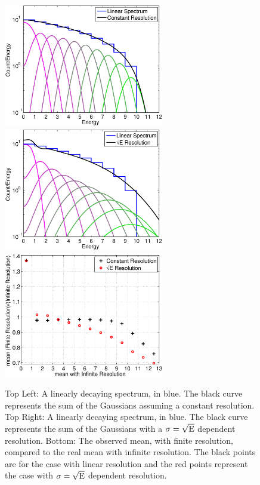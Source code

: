  \begin{figure}[h!]\centering
\includegraphics[width=70mm]{Chapter_Flucs/Figures/Toy_Model_lin_const}
\includegraphics[width=70mm]{Chapter_Flucs/Figures/Toy_Model_lin_dep}
\includegraphics[width=70mm]{Chapter_Flucs/Figures/Toy_Model_mean_shift}
\caption{Top Left: A linearly decaying spectrum, in blue. The black curve represents the sum of the Gaussians assuming a constant resolution. Top Right: A linearly decaying spectrum, in blue. The black curve represents the sum of the Gaussians with a $\rm \sigma= \sqrt{E}$ dependent resolution. Bottom: The observed mean, with finite resolution, compared to the real mean with infinite resolution. The black points are for the case with linear resolution and the red points represent the case with $\rm \sigma = \sqrt{E}$ dependent resolution.}
\label{fig:Toy_Linear}
\end{figure}

\newpage



